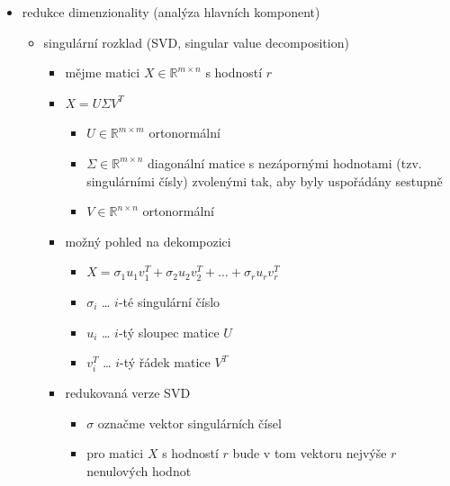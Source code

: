 \begin{itemize}
\begin{itemize}
\begin{itemize}
\begin{itemize}
\begin{itemize}
\item když ho vhodně zařízneme, tak získáme použitelné dělení (aby clusterů nebylo ani málo, ani moc)
\end{itemize}
\end{itemize}
\item principal directions divisive partitioning (PDDP)
\begin{itemize}
\item používá princip PCA - dělí clustery pomocí projekce na hlavní komponenty
\end{itemize}
\end{itemize}
\item většinou se jedná o hladové algoritmy $\to$ nelze zaručit, že je řešení optimální
\end{itemize}
\item redukce dimenzionality (analýza hlavních komponent)
\begin{itemize}
\item singulární rozklad (SVD, singular value decomposition)
\begin{itemize}
\item mějme matici $X\in\mathbb R^{m\times n}$ s hodností $r$
\item $X=U\Sigma V^T$
\begin{itemize}
\item $U\in\mathbb R^{m\times m}$ ortonormální
\item $\Sigma\in\mathbb R^{m\times n}$ diagonální matice s nezápornými hodnotami (tzv. singulárními čísly) zvolenými tak, aby byly uspořádány sestupně
\item $V\in\mathbb R^{n\times n}$ ortonormální
\end{itemize}
\item možný pohled na dekompozici
\begin{itemize}
\item $X=\sigma_1u_1v_1^T+\sigma_2u_2v_2^T+\dots+\sigma_ru_rv_r^T$
\item $\sigma_i$ \dots{} $i$-té singulární číslo
\item $u_i$ \dots{} $i$-tý sloupec matice $U$
\item $v_i^T$ \dots{} $i$-tý řádek matice $V^T$
\end{itemize}
\item redukovaná verze SVD
\begin{itemize}
\item $\sigma$ označme vektor singulárních čísel
\item pro matici $X$ s hodností $r$ bude v tom vektoru nejvýše $r$ nenulových hodnot

\end{itemize}
\end{itemize}
\end{itemize}
\end{itemize}
